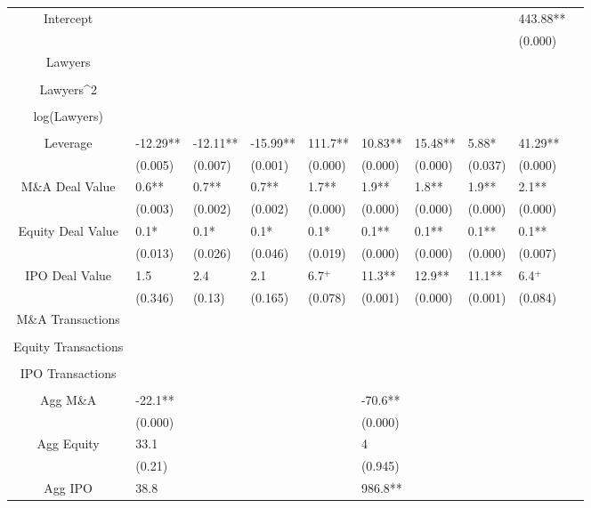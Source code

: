 \documentclass{article}
\begin{document}
\begin{table}[H]
\begin{tabular}{|clllllllll|}
Intercept &  &  &  &  &  &  &  & 443.88** & \\ 
   &  &  &  &  &  &  &  & (0.000) & \\ 
  Lawyers &  &  &  &  &  &  &  &  & \\ 
   &  &  &  &  &  &  &  &  & \\ 
  Lawyers^2 &  &  &  &  &  &  &  &  & \\ 
   &  &  &  &  &  &  &  &  & \\ 
  log(Lawyers) &  &  &  &  &  &  &  &  & \\ 
   &  &  &  &  &  &  &  &  & \\ 
  Leverage & -12.29** & -12.11** & -15.99** & 111.7** & 10.83** & 15.48** & 5.88* & 41.29** & \\ 
   & (0.005) & (0.007) & (0.001) & (0.000) & (0.000) & (0.000) & (0.037) & (0.000) & \\ 
  M\&A Deal Value & 0.6** & 0.7** & 0.7** & 1.7** & 1.9** & 1.8** & 1.9** & 2.1** & \\ 
   & (0.003) & (0.002) & (0.002) & (0.000) & (0.000) & (0.000) & (0.000) & (0.000) & \\ 
  Equity Deal Value & 0.1* & 0.1* & 0.1* & 0.1* & 0.1** & 0.1** & 0.1** & 0.1** & \\ 
   & (0.013) & (0.026) & (0.046) & (0.019) & (0.000) & (0.000) & (0.000) & (0.007) & \\ 
  IPO Deal Value & 1.5 & 2.4 & 2.1 & 6.7$^{+}$ & 11.3** & 12.9** & 11.1** & 6.4$^{+}$ & \\ 
   & (0.346) & (0.13) & (0.165) & (0.078) & (0.001) & (0.000) & (0.001) & (0.084) & \\ 
  M\&A Transactions &  &  &  &  &  &  &  &  & \\ 
   &  &  &  &  &  &  &  &  & \\ 
  Equity Transactions &  &  &  &  &  &  &  &  & \\ 
   &  &  &  &  &  &  &  &  & \\ 
  IPO Transactions &  &  &  &  &  &  &  &  & \\ 
   &  &  &  &  &  &  &  &  & \\ 
  Agg M\&A & -22.1** &  &  &  & -70.6** &  &  &  & \\ 
   & (0.000) &  &  &  & (0.000) &  &  &  & \\ 
  Agg Equity & 33.1 &  &  &  & 4 &  &  &  & \\ 
   & (0.21) &  &  &  & (0.945) &  &  &  & \\ 
  Agg IPO & 38.8 &  &  &  & 986.8** &  &  &  & \\ 

\end{tabular}
\end{table}
\end{document}
